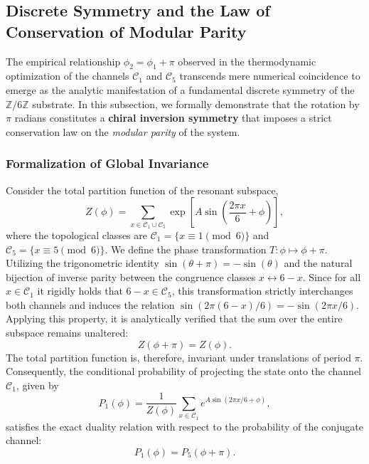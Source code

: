 \documentclass[12pt,a4paper]{article}
\theoremstyle{plain}
\theoremstyle{definition}
\theoremstyle{remark}
\begin{document}
\subsection{Discrete Symmetry and the Law of Conservation of Modular Parity}
\label{subsec:simetria_inversion}

The empirical relationship $\phi_2 = \phi_1 + \pi$ observed in the thermodynamic optimization of the channels $\mathcal{C}_1$ and $\mathcal{C}_5$ transcends mere numerical coincidence to emerge as the analytic manifestation of a fundamental discrete symmetry of the $\mathbb{Z}/6\mathbb{Z}$ substrate. In this subsection, we formally demonstrate that the rotation by $\pi$ radians constitutes a \textbf{chiral inversion symmetry} that imposes a strict conservation law on the \textit{modular parity} of the system.

\subsubsection*{Formalization of Global Invariance}

Consider the total partition function of the resonant subspace,
\begin{equation}
Z(\phi) = \sum_{x \in \mathcal{C}_1 \cup \mathcal{C}_5} \exp\left[A \sin\left(\frac{2\pi x}{6} + \phi\right)\right],
\end{equation}
where the topological classes are $\mathcal{C}_1 = \{x \equiv 1 \pmod{6}\}$ and $\mathcal{C}_5 = \{x \equiv 5 \pmod{6}\}$. We define the phase transformation $T: \phi \mapsto \phi + \pi$. Utilizing the trigonometric identity $\sin(\theta+\pi) = -\sin(\theta)$ and the natural bijection of inverse parity between the congruence classes $x \leftrightarrow 6-x$. Since for all $x \in \mathcal{C}_1$ it rigidly holds that $6-x \in \mathcal{C}_5$, this transformation strictly interchanges both channels and induces the relation $\sin(2\pi(6-x)/6) = -\sin(2\pi x/6)$. Applying this property, it is analytically verified that the sum over the entire subspace remains unaltered:
\begin{equation}
Z(\phi + \pi) = Z(\phi).
\label{eq:periodicidad_Z}
\end{equation}
The total partition function is, therefore, invariant under translations of period $\pi$. Consequently, the conditional probability of projecting the state onto the channel $\mathcal{C}_1$, given by
\begin{equation}
P_1(\phi) = \frac{1}{Z(\phi)}\sum_{x\in\mathcal{C}_1} e^{A\sin(2\pi x/6 + \phi)},
\end{equation}
satisfies the exact duality relation with respect to the probability of the conjugate channel:
\begin{equation}
P_1(\phi) = P_5(\phi+\pi).
\label{eq:dualidad_prob}
\end{equation}
\end{document}
